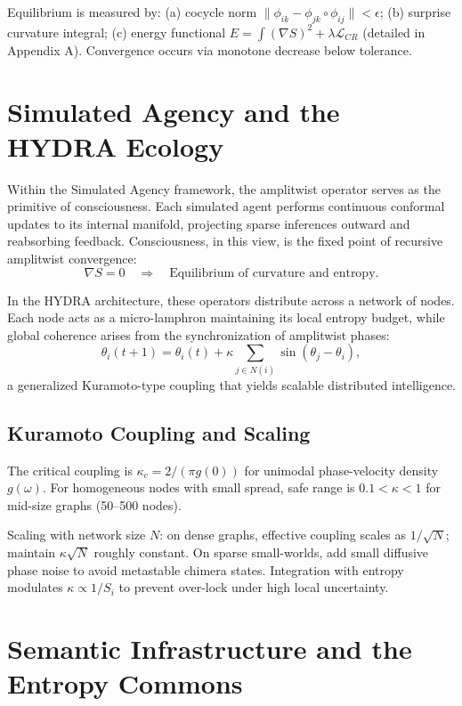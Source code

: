 \documentclass[12pt]{article}
\begin{document}
Equilibrium is measured by: (a) cocycle norm $\|\phi_{ik} - \phi_{jk} \circ \phi_{ij}\|< \epsilon$; (b) surprise curvature integral; (c) energy functional $E = \int (\nabla S)^2 + \lambda \mathcal{L}_{CR}$ (detailed in Appendix A). Convergence occurs via monotone decrease below tolerance.

\section{Simulated Agency and the HYDRA Ecology}

Within the Simulated Agency framework, the amplitwist operator serves as the primitive of consciousness.
Each simulated agent performs continuous conformal updates to its internal manifold, projecting sparse inferences outward and reabsorbing feedback.
Consciousness, in this view, is the fixed point of recursive amplitwist convergence:
\[
\nabla S = 0 \quad \Rightarrow \quad \text{Equilibrium of curvature and entropy.}
\]

In the HYDRA architecture, these operators distribute across a network of nodes.
Each node acts as a micro-lamphron maintaining its local entropy budget, while global coherence arises from the synchronization of amplitwist phases:
\[
\theta_i(t+1) = \theta_i(t) + \kappa \sum_{j \in N(i)} \sin(\theta_j - \theta_i),
\]
a generalized Kuramoto-type coupling that yields scalable distributed intelligence.

\subsection{Kuramoto Coupling and Scaling}

The critical coupling is $\kappa_c = 2 / (\pi g(0))$ for unimodal phase-velocity density $g(\omega)$. For homogeneous nodes with small spread, safe range is $0.1 < \kappa < 1$ for mid-size graphs (50–500 nodes).

Scaling with network size $N$: on dense graphs, effective coupling scales as $1/\sqrt{N}$; maintain $\kappa \sqrt{N}$ roughly constant. On sparse small-worlds, add small diffusive phase noise to avoid metastable chimera states. Integration with entropy modulates $\kappa \propto 1/S_i$ to prevent over-lock under high local uncertainty.

\section{Semantic Infrastructure and the Entropy Commons}
\end{document}
